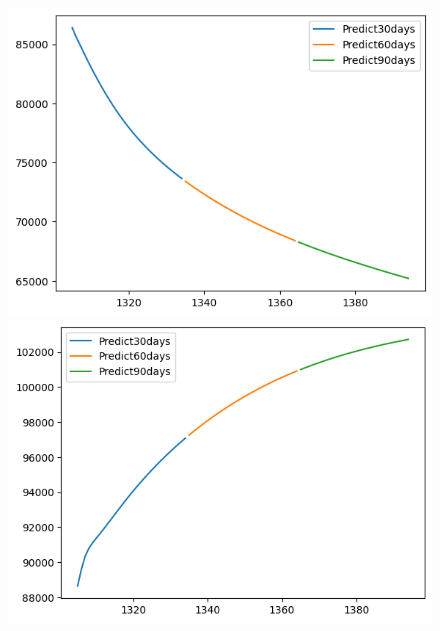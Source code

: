 \begin{figure}[H]
\begin{minipage}{0.15\textwidth}
    \includegraphics[width=1\textwidth]{resources/chapter-5/newdata1/predicted/VCB_ LSTM_8-2_30days.png}
    \end{minipage}
    \hfill
        \begin{minipage}{0.15\textwidth}
    \centering
    \includegraphics[width=1\textwidth]{resources/chapter-5/newdata1/predicted/VCB_ LSTM_9-1_30days.png}
    \end{minipage}
    \hfill
    \begin{minipage}{0.15\textwidth}
    \centering

\end{minipage}
\end{figure}
